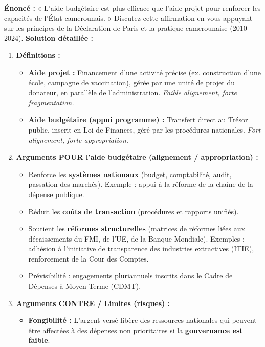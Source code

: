 \documentclass[11pt]{article}
\newcommand{\cle}[1]{{\popxbold\color{popdark}#1}}
\begin{document}
\begin{exoresolu}
    \textbf{Énoncé :} « L'aide budgétaire est plus efficace que l'aide projet pour renforcer les capacités de l'État camerounais. » Discutez cette affirmation en vous appuyant sur les principes de la Déclaration de Paris et la pratique camerounaise (2010-2024).
    \tcblower
    \textbf{Solution détaillée :}
    \begin{enumerate}
        \item \textbf{Définitions :}
            \begin{itemize}
                \item \textbf{Aide projet :} Financement d'une activité précise (ex. construction d'une école, campagne de vaccination), gérée par une unité de projet du donateur, en parallèle de l'administration. \emph{Faible alignement, forte fragmentation.}
                \item \textbf{Aide budgétaire (appui programme) :} Transfert direct au Trésor public, inscrit en Loi de Finances, géré par les procédures nationales. \emph{Fort alignement, forte appropriation.}
            \end{itemize}
        \item \textbf{Arguments POUR l'aide budgétaire (alignement / appropriation) :}
            \begin{itemize}
                \item Renforce les \textbf{systèmes nationaux} (budget, comptabilité, audit, passation des marchés). Exemple : appui à la réforme de la \cle{chaîne de la dépense publique}.
                \item Réduit les \textbf{coûts de transaction} (procédures et rapports unifiés).
                \item Soutient les \textbf{réformes structurelles} (matrices de réformes liées aux décaissements du FMI, de l'UE, de la Banque Mondiale). Exemples : adhésion à l'initiative de transparence des industries extractives (ITIE), renforcement de la Cour des Comptes.
                \item Prévisibilité : engagements pluriannuels inscrits dans le Cadre de Dépenses à Moyen Terme (CDMT).
            \end{itemize}
        \item \textbf{Arguments CONTRE / Limites (risques) :}
            \begin{itemize}
                \item \textbf{Fongibilité :} L'argent versé libère des ressources nationales qui peuvent être affectées à des dépenses non prioritaires si la \textbf{gouvernance est faible}.

\end{itemize}
\end{enumerate}
\end{exoresolu}
\end{document}
